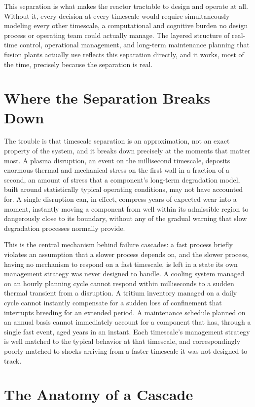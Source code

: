This separation is what makes the reactor tractable to design and operate at all. Without it, every decision at every timescale would require simultaneously modeling every other timescale, a computational and cognitive burden no design process or operating team could actually manage. The layered structure of real-time control, operational management, and long-term maintenance planning that fusion plants actually use reflects this separation directly, and it works, most of the time, precisely because the separation is real.

\section{Where the Separation Breaks Down}

The trouble is that timescale separation is an approximation, not an exact property of the system, and it breaks down precisely at the moments that matter most. A plasma disruption, an event on the millisecond timescale, deposits enormous thermal and mechanical stress on the first wall in a fraction of a second, an amount of stress that a component's long-term degradation model, built around statistically typical operating conditions, may not have accounted for. A single disruption can, in effect, compress years of expected wear into a moment, instantly moving a component from well within its admissible region to dangerously close to its boundary, without any of the gradual warning that slow degradation processes normally provide.

This is the central mechanism behind failure cascades: a fast process briefly violates an assumption that a slower process depends on, and the slower process, having no mechanism to respond on a fast timescale, is left in a state its own management strategy was never designed to handle. A cooling system managed on an hourly planning cycle cannot respond within milliseconds to a sudden thermal transient from a disruption. A tritium inventory managed on a daily cycle cannot instantly compensate for a sudden loss of confinement that interrupts breeding for an extended period. A maintenance schedule planned on an annual basis cannot immediately account for a component that has, through a single fast event, aged years in an instant. Each timescale's management strategy is well matched to the typical behavior at that timescale, and correspondingly poorly matched to shocks arriving from a faster timescale it was not designed to track.

\section{The Anatomy of a Cascade}


